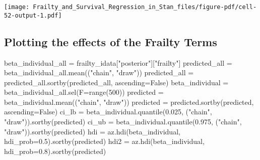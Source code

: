 \documentclass[
  letterpaper,
  DIV=11,
  numbers=noendperiod]{scrartcl}
\newenvironment{Shaded}{\begin{snugshade}}{\end{snugshade}}
\newcommand{\BuiltInTok}[1]{\textcolor[rgb]{0.00,0.23,0.31}{#1}}
\newcommand{\DecValTok}[1]{\textcolor[rgb]{0.68,0.00,0.00}{#1}}
\newcommand{\FloatTok}[1]{\textcolor[rgb]{0.68,0.00,0.00}{#1}}
\newcommand{\NormalTok}[1]{\textcolor[rgb]{0.00,0.23,0.31}{#1}}
\newcommand{\OperatorTok}[1]{\textcolor[rgb]{0.37,0.37,0.37}{#1}}
\newcommand{\StringTok}[1]{\textcolor[rgb]{0.13,0.47,0.30}{#1}}
\newcommand{\VariableTok}[1]{\textcolor[rgb]{0.07,0.07,0.07}{#1}}
\begin{document}
\texttt{[image: Frailty\_and\_Survival\_Regression\_in\_Stan\_files/figure-pdf/cell-52-output-1.pdf]}

\subsection{Plotting the effects of the Frailty
Terms}\label{plotting-the-effects-of-the-frailty-terms}

\begin{Shaded}
\begin{Highlighting}[]
\NormalTok{beta\_individual\_all }\OperatorTok{=}\NormalTok{ frailty\_idata[}\StringTok{"posterior"}\NormalTok{][}\StringTok{"frailty"}\NormalTok{]}
\NormalTok{predicted\_all }\OperatorTok{=}\NormalTok{ beta\_individual\_all.mean((}\StringTok{"chain"}\NormalTok{, }\StringTok{"draw"}\NormalTok{))}
\NormalTok{predicted\_all }\OperatorTok{=}\NormalTok{ predicted\_all.sortby(predicted\_all, ascending}\OperatorTok{=}\VariableTok{False}\NormalTok{)}
\NormalTok{beta\_individual }\OperatorTok{=}\NormalTok{ beta\_individual\_all.sel(F}\OperatorTok{=}\BuiltInTok{range}\NormalTok{(}\DecValTok{500}\NormalTok{))}
\NormalTok{predicted }\OperatorTok{=}\NormalTok{ beta\_individual.mean((}\StringTok{"chain"}\NormalTok{, }\StringTok{"draw"}\NormalTok{))}
\NormalTok{predicted }\OperatorTok{=}\NormalTok{ predicted.sortby(predicted, ascending}\OperatorTok{=}\VariableTok{False}\NormalTok{)}
\NormalTok{ci\_lb }\OperatorTok{=}\NormalTok{ beta\_individual.quantile(}\FloatTok{0.025}\NormalTok{, (}\StringTok{"chain"}\NormalTok{, }\StringTok{"draw"}\NormalTok{)).sortby(predicted)}
\NormalTok{ci\_ub }\OperatorTok{=}\NormalTok{ beta\_individual.quantile(}\FloatTok{0.975}\NormalTok{, (}\StringTok{"chain"}\NormalTok{, }\StringTok{"draw"}\NormalTok{)).sortby(predicted)}
\NormalTok{hdi }\OperatorTok{=}\NormalTok{ az.hdi(beta\_individual, hdi\_prob}\OperatorTok{=}\FloatTok{0.5}\NormalTok{).sortby(predicted)}
\NormalTok{hdi2 }\OperatorTok{=}\NormalTok{ az.hdi(beta\_individual, hdi\_prob}\OperatorTok{=}\FloatTok{0.8}\NormalTok{).sortby(predicted)}
\end{Highlighting}
\end{Shaded}
\end{document}
